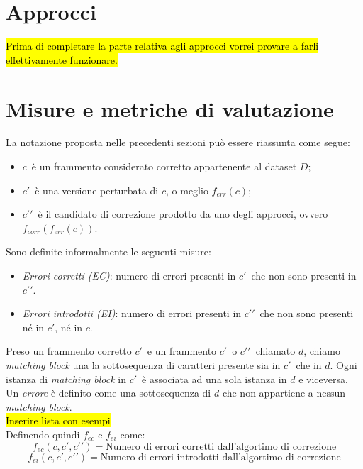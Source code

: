 \documentclass[12pt]{article}
\begin{document}
\section{Approcci} \label{sec:approcci}
\hl{Prima di completare la parte relativa agli approcci vorrei provare a farli effettivamente funzionare.}

\section{Misure e metriche di valutazione} \label{sec:metriche}
\newcommand{\cz}{$c$}
\newcommand{\cp}{$c\prime$}
\newcommand{\cs}{$c\prime\prime$}
La notazione proposta nelle precedenti sezioni può essere riassunta come segue:
\begin{itemize}
\item \cz\ è un frammento considerato corretto appartenente al dataset $D$;
\item \cp\ è una versione perturbata di \cz, o meglio $f_{err}(c)$;
\item \cs\ è il candidato di correzione prodotto da uno degli approcci, ovvero $f_{corr}(f_{err}(c))$.
\end{itemize}
Sono definite informalmente le seguenti misure:
\begin{itemize}
\item \textit{Errori corretti (EC)}: numero di errori presenti in \cp\ che non sono presenti in \cs.
\item \textit{Errori introdotti (EI)}: numero di errori presenti in \cs\ che non sono presenti né in \cp, né in \cz. 
\end{itemize}Preso un frammento corretto \cp\ e un frammento \cp\ o \cs\ chiamato $d$, chiamo \textit{matching block} una la sottosequenza di caratteri presente sia in \cp\ che in $d$. Ogni istanza di \textit{matching block} in \cp\ è associata ad una sola istanza in $d$ e viceversa.\\
Un \textit{errore} è definito come una sottosequenza di $d$ che non appartiene a nessun \textit{matching block}.\\
\hl{Inserire lista con esempi}
\\
Definendo quindi $f_{ec}$ e $f_{ei}$ come:
\begin{equation}
	f_{ec}(c,c\prime,c\prime\prime) = \text{Numero di errori corretti dall'algortimo di correzione}
\end{equation}
\begin{equation}
	f_{ei}(c,c\prime,c\prime\prime) = \text{Numero di errori introdotti dall'algortimo di correzione}
\end{equation}
\end{document}
